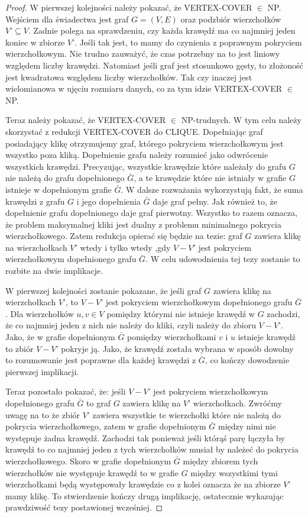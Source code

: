 \begin{proof}

W pierwszej kolejności należy pokazać, że VERTEX-COVER $\in$ NP. Wejściem dla świadectwa jest graf $G=(V,E)$ oraz podzbiór wierzchołków $V’ \subseteq V$. Zadnie polega na sprawdzeniu, czy każda krawędź ma co najmniej jeden koniec w zbiorze $V’$. Jeśli tak jest, to mamy do czynienia z poprawnym pokryciem wierzchołkowym. Nie trudno zauważyć, że czas potrzebny na to jest liniowy względem liczby krawędzi. Natomiast jeśli graf jest stosunkowo gęsty, to złożoność jest kwadratowa względem liczby wierzchołków. Tak czy inaczej jest wielomianowa w ujęciu rozmiaru danych, co za tym idzie VERTEX-COVER $\in$ NP.

Teraz należy pokazać, że VERTEX-COVER $\in$ NP-trudnych. W tym celu należy skorzystać z redukcji VERTEX-COVER do CLIQUE. Dopełniając graf posiadający klikę otrzymujemy graf, którego pokryciem wierzchołkowym jest wszystko poza kliką. Dopełnienie grafu należy rozumieć jako odwrócenie wszystkich krawędzi. Precyzując, wszystkie krawędzie które należały do grafu $G$ nie należą do grafu dopełnionego $\bar{G}$, a te krawędzie które nie istniały w grafie $G$ istnieje w dopełnionym grafie $\bar{G}$. W dalsze rozważania wykorzystują fakt, że suma krawędzi z grafu $G$ i jego dopełnienia $\bar{G}$ daje graf pełny. Jak również to, że dopełnienie grafu dopełnionego daje graf pierwotny. Wszystko to razem oznacza, że problem maksymalnej kliki jest dualny z problemu minimalnego pokrycia wierzchołkowego. Zatem redukcja opierać się będzie na tezie: graf $G$ zawiera klikę na wierzchołkach $V'$ wtedy i tylko wtedy ,gdy $V-V'$ jest pokryciem wierzchołkowym dopełnionego grafu $\bar{G}$. W celu udowodnienia tej tezy zostanie to rozbite na dwie implikacje.

W pierwszej kolejności zostanie pokazane, że jeśli graf $G$ zawiera klikę na wierzchołkach $V’$, to $V-V’$ jest pokryciem wierzchołkowym dopełnionego grafu $\bar{G}$. Dla wierzchołków $ u,v \in V$ pomiędzy którymi nie istnieje krawędź w $G$ zachodzi, że co najmniej jeden z nich nie należy do kliki, czyli należy do zbioru $V-V’$. Jako, że w grafie dopełnionym $\bar{G}$ pomiędzy wierzchołkami $v$ i $u$ istnieje krawędź to zbiór $V-V’$ pokryje ją. Jako, że krawędź została wybrana w sposób dowolny to rozumowanie jest poprawne dla każdej krawędzi z $\bar{G}$, co kończy dowodzenie pierwszej implikacji.

Teraz pozostało pokazać, że: jeśli $V-V’$ jest pokryciem wierzchołkowym dopełnionego grafu $\bar{G}$ to graf $G$ zawiera klikę na $V’$ wierzchołkach. Zwróćmy uwagę na to że zbiór $V’$ zawiera wszystkie te wierzchołki które nie należą do pokrycia wierzchołkowego, zatem w grafie dopełnionym $\bar{G}$ między nimi nie występuje żadna krawędź. Zachodzi tak ponieważ jeśli którąś parę łączyła by krawędź to co najmniej jeden z tych wierzchołków musiał by należeć  do pokrycia wierzchołkowego. Skoro w grafie dopełnionym $\bar{G}$ między zbiorem tych wierzchołków nie występuje krawędź to w grafie $G$ między wszystkimi tymi wierzchołkami będą występowały krawędzie co z kolei oznacza że na zbiorze $V’$ mamy klikę. To stwierdzenie kończy drugą implikację, ostatecznie wykazując prawdziwość tezy postawionej wcześniej.


\end{proof}
